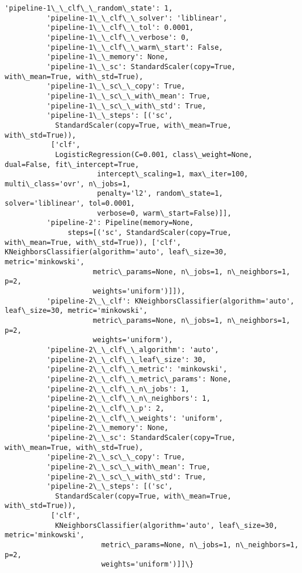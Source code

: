 \documentclass[11pt]{article}
\begin{document}
\begin{Verbatim}[commandchars=\\\{\}]
          'pipeline-1\_\_clf\_\_random\_state': 1,
          'pipeline-1\_\_clf\_\_solver': 'liblinear',
          'pipeline-1\_\_clf\_\_tol': 0.0001,
          'pipeline-1\_\_clf\_\_verbose': 0,
          'pipeline-1\_\_clf\_\_warm\_start': False,
          'pipeline-1\_\_memory': None,
          'pipeline-1\_\_sc': StandardScaler(copy=True, with\_mean=True, with\_std=True),
          'pipeline-1\_\_sc\_\_copy': True,
          'pipeline-1\_\_sc\_\_with\_mean': True,
          'pipeline-1\_\_sc\_\_with\_std': True,
          'pipeline-1\_\_steps': [('sc',
            StandardScaler(copy=True, with\_mean=True, with\_std=True)),
           ['clf',
            LogisticRegression(C=0.001, class\_weight=None, dual=False, fit\_intercept=True,
                      intercept\_scaling=1, max\_iter=100, multi\_class='ovr', n\_jobs=1,
                      penalty='l2', random\_state=1, solver='liblinear', tol=0.0001,
                      verbose=0, warm\_start=False)]],
          'pipeline-2': Pipeline(memory=None,
               steps=[('sc', StandardScaler(copy=True, with\_mean=True, with\_std=True)), ['clf', KNeighborsClassifier(algorithm='auto', leaf\_size=30, metric='minkowski',
                     metric\_params=None, n\_jobs=1, n\_neighbors=1, p=2,
                     weights='uniform')]]),
          'pipeline-2\_\_clf': KNeighborsClassifier(algorithm='auto', leaf\_size=30, metric='minkowski',
                     metric\_params=None, n\_jobs=1, n\_neighbors=1, p=2,
                     weights='uniform'),
          'pipeline-2\_\_clf\_\_algorithm': 'auto',
          'pipeline-2\_\_clf\_\_leaf\_size': 30,
          'pipeline-2\_\_clf\_\_metric': 'minkowski',
          'pipeline-2\_\_clf\_\_metric\_params': None,
          'pipeline-2\_\_clf\_\_n\_jobs': 1,
          'pipeline-2\_\_clf\_\_n\_neighbors': 1,
          'pipeline-2\_\_clf\_\_p': 2,
          'pipeline-2\_\_clf\_\_weights': 'uniform',
          'pipeline-2\_\_memory': None,
          'pipeline-2\_\_sc': StandardScaler(copy=True, with\_mean=True, with\_std=True),
          'pipeline-2\_\_sc\_\_copy': True,
          'pipeline-2\_\_sc\_\_with\_mean': True,
          'pipeline-2\_\_sc\_\_with\_std': True,
          'pipeline-2\_\_steps': [('sc',
            StandardScaler(copy=True, with\_mean=True, with\_std=True)),
           ['clf',
            KNeighborsClassifier(algorithm='auto', leaf\_size=30, metric='minkowski',
                       metric\_params=None, n\_jobs=1, n\_neighbors=1, p=2,
                       weights='uniform')]]\}
\end{Verbatim}
            
\end{document}
